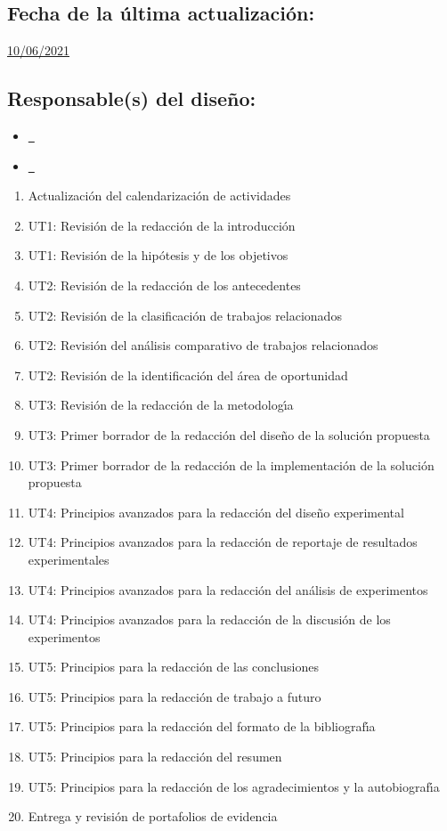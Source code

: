 \documentclass[10 pt]{article}
\begin{document}
\subsection{Fecha de la \'{u}ltima actualizaci\'{o}n:} \underline{10/06/2021}
\subsection{Responsable(s) del dise\~{n}o:}
\begin{itemize}[label={}]
\item \underline{\nroger~\roger}
\item \underline{\nelisa~\elisa}
\end{itemize}
\newpage



\begin{enumerate}[itemsep=-2pt]
\item Actualizaci\'{o}n del calendarizaci\'{o}n de actividades
\item UT1: Revisi\'{o}n de la redacci\'{o}n de la introducci\'{o}n
\item UT1: Revisi\'{o}n de la hip\'{o}tesis y de los objetivos
\item UT2: Revisi\'{o}n de la redacci\'{o}n de los antecedentes
\item UT2: Revisi\'{o}n de la clasificaci\'{o}n de trabajos relacionados
\item UT2: Revisi\'{o}n del an\'{a}lisis comparativo de trabajos relacionados
\item UT2: Revisi\'{o}n de la identificaci\'{o}n del \'{a}rea de oportunidad
\item UT3: Revisi\'{o}n de la redacci\'{o}n de la metodolog\'{\i}a
\item UT3: Primer borrador de la redacci\'{o}n del dise\~{n}o de la soluci\'{o}n propuesta
\item UT3: Primer borrador de la redacci\'{o}n de la implementaci\'{o}n de la soluci\'{o}n propuesta
\item UT4: Principios avanzados para la redacci\'{o}n del dise\~{n}o experimental
\item UT4: Principios avanzados para la redacci\'{o}n de reportaje de resultados experimentales
\item UT4: Principios avanzados para la redacci\'{o}n del an\'{a}lisis de experimentos
\item UT4: Principios avanzados para la redacci\'{o}n de la discusi\'{o}n de los experimentos
\item UT5: Principios para la redacci\'{o}n de las conclusiones
\item UT5: Principios para la redacci\'{o}n de trabajo a futuro
\item UT5: Principios para la redacci\'{o}n del formato de la bibliograf\'{\i}a
\item UT5: Principios para la redacci\'{o}n del resumen
\item UT5: Principios para la redacci\'{o}n de los agradecimientos y la autobiograf\'{\i}a
\item Entrega y revisi\'{o}n de portafolios de evidencia
\end{enumerate}
\end{document}
